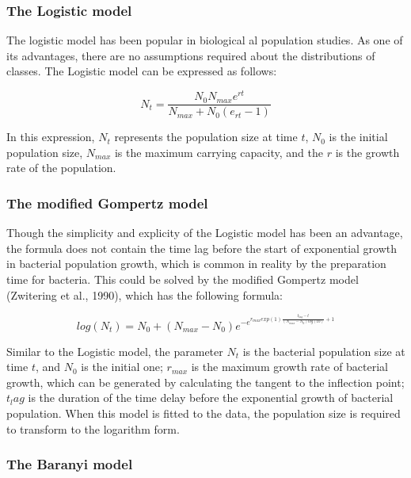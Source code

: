 \documentclass[11pt, oneside]{article}
\begin{document}
 			\subsubsection{The Logistic model}
			
			The logistic model has been popular in biological al population studies. As one of its advantages, there are no assumptions required about the distributions of classes. The Logistic model can be expressed as follows:
			
			\[N_t = \frac{N_0 N_{max} e^{rt}}{N_{max} + N_0(e_{rt} - 1)}\]
			
			\bigbreak
			\noindent In this expression, \(N_t\) represents the population size at time \(t\), \(N_0\) is the initial population size, \(N_{max}\) is the maximum carrying capacity, and the \(r\) is the growth rate of the population. 
			
			\subsubsection{The modified Gompertz model}
			
			Though the simplicity and explicity of the Logistic model has been an advantage, the formula does not contain the time lag before the start of exponential growth in bacterial population growth, which is common in reality by the preparation time for bacteria. This could be solved by the modified Gompertz model \cite{Zwitering}(Zwitering et al., 1990), which has the following formula:
			
			\[log(N_t) = N_0 + (N_{max} - N_0) e^{-e^{r_{max}exp(1)\frac{t_{lag}-t}{(N_{max}-N_0)log(10)} + 1}}\]
			
			\bigbreak
			\noindent Similar to the Logistic model, the parameter \(N_t\) is the bacterial population size at time \(t\), and \(N_0\) is the initial one; \(r_{max}\) is the maximum growth rate of bacterial growth, which can be generated by calculating the tangent to the inflection point; \(t_lag\) is the duration of the time delay before the exponential growth of bacterial population. When this model is fitted to the data, the population size is required to transform to the logarithm form. 
			
			\subsubsection{The Baranyi model}
			
\end{document}

